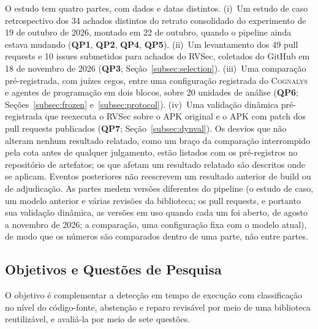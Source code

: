 \documentclass[conference]{IEEEtran}
\newcommand{\system}{\textsc{Cognalys}}
\newcommand{\researchq}[1]{\textbf{QP#1}}
\begin{document}
O estudo tem quatro partes, com dados e datas distintos. (i)~Um estudo de caso
retrospectivo dos 34 achados distintos do retrato consolidado do
experimento de 19 de outubro de 2026, montado em 22 de outubro, quando o pipeline
ainda estava mudando (\researchq{1}, \researchq{2}, \researchq{4}, \researchq{5}).
(ii)~Um levantamento dos 49 pull requests e 10 issues submetidos para achados do
RVSec, coletados do GitHub em 18 de novembro de 2026 (\researchq{3};
Seção~\ref{subsec:selection}). (iii)~Uma comparação pré-registrada, com juízes
cegos, entre uma configuração registrada do {\system} e agentes de programação em dois
blocos, sobre 20 unidades de análise
(\researchq{6}; Seções~\ref{subsec:frozen} e~\ref{subsec:protocol}).
(iv)~Uma validação dinâmica pré-registrada que reexecuta o RVSec sobre o APK original e
o APK com patch dos pull requests publicados (\researchq{7};
Seção~\ref{subsec:dynval}). Os desvios que não alteram nenhum resultado
relatado, como um braço da comparação interrompido pela cota antes de qualquer
julgamento, estão listados com os pré-registros no repositório de artefatos; os
que afetam um resultado relatado são descritos onde se aplicam. Eventos
posteriores não reescrevem um resultado anterior de build ou de adjudicação.
As partes medem versões diferentes do pipeline (o estudo de caso, um modelo
anterior e várias revisões da biblioteca; os pull requests, e portanto sua
validação dinâmica, as versões em uso quando cada um foi aberto, de agosto a
novembro de 2026; a comparação, uma configuração fixa com o modelo atual), de
modo que os números são comparados dentro de uma parte, não entre partes.

\subsection{Objetivos e Questões de Pesquisa}
\label{subsec:rqs}

O objetivo é complementar a detecção em tempo de execução com classificação no
nível do código-fonte, abstenção e reparo revisável por meio de uma biblioteca
reutilizável, e avaliá-la por meio de sete questões.
\end{document}
